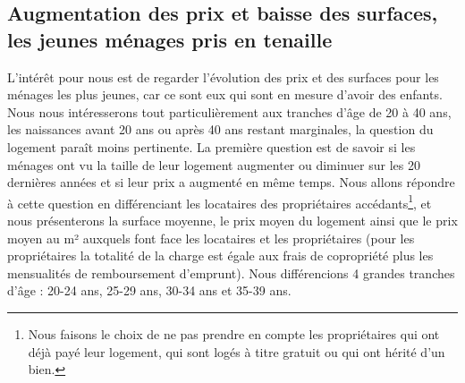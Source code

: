\documentclass[12pt,a4paper]{article}
\begin{document}
\newpage

\subsection{Augmentation des prix et baisse des surfaces, les jeunes ménages pris en tenaille}

L’intérêt pour nous est de regarder l’évolution des prix et des surfaces pour les ménages les plus jeunes, car ce sont eux qui sont en mesure d’avoir des enfants. Nous nous intéresserons tout particulièrement aux tranches d’âge de 20 à 40 ans, les naissances avant 20 ans ou après 40 ans restant marginales, la question du logement paraît moins pertinente. La première question est de savoir si les ménages ont vu la taille de leur logement augmenter ou diminuer sur les 20 dernières années et si leur prix a augmenté en même temps. Nous allons répondre à cette question en différenciant les locataires des propriétaires accédants\footnote{Nous faisons le choix de ne pas prendre en compte les propriétaires qui ont déjà payé leur logement, qui sont logés à titre gratuit ou qui ont hérité d’un bien.}, et nous présenterons la surface moyenne, le prix moyen du logement ainsi que le prix moyen au m² auxquels font face les locataires et les propriétaires (pour les propriétaires la totalité de la charge est égale aux frais de copropriété plus les mensualités de remboursement d’emprunt). Nous différencions 4 grandes tranches d’âge : 20-24 ans, 25-29 ans, 30-34 ans et 35-39 ans. \\
\end{document}
